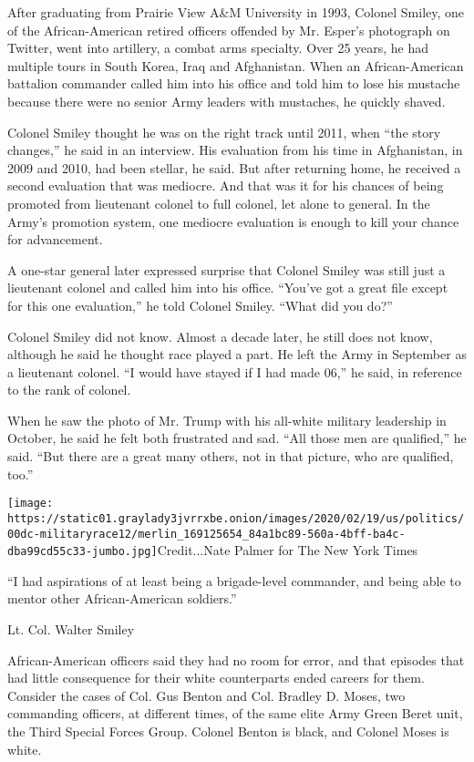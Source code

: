 After graduating from Prairie View A\&M University in 1993, Colonel
Smiley, one of the African-American retired officers offended by Mr.
Esper's photograph on Twitter, went into artillery, a combat arms
specialty. Over 25 years, he had multiple tours in South Korea, Iraq and
Afghanistan. When an African-American battalion commander called him
into his office and told him to lose his mustache because there were no
senior Army leaders with mustaches, he quickly shaved.

Colonel Smiley thought he was on the right track until 2011, when ``the
story changes,'' he said in an interview. His evaluation from his time
in Afghanistan, in 2009 and 2010, had been stellar, he said. But after
returning home, he received a second evaluation that was mediocre. And
that was it for his chances of being promoted from lieutenant colonel to
full colonel, let alone to general. In the Army's promotion system, one
mediocre evaluation is enough to kill your chance for advancement.

A one-star general later expressed surprise that Colonel Smiley was
still just a lieutenant colonel and called him into his office. ``You've
got a great file except for this one evaluation,'' he told Colonel
Smiley. ``What did you do?''

Colonel Smiley did not know. Almost a decade later, he still does not
know, although he said he thought race played a part. He left the Army
in September as a lieutenant colonel. ``I would have stayed if I had
made 06,'' he said, in reference to the rank of colonel.

When he saw the photo of Mr. Trump with his all-white military
leadership in October, he said he felt both frustrated and sad. ``All
those men are qualified,'' he said. ``But there are a great many others,
not in that picture, who are qualified, too.''

\texttt{[image: https://static01.graylady3jvrrxbe.onion/images/2020/02/19/us/politics/00dc-militaryrace12/merlin\_169125654\_84a1bc89-560a-4bff-ba4c-dba99cd55c33-jumbo.jpg]}Credit...Nate
Palmer for The New York Times

``I had aspirations of at least being a brigade-level commander, and
being able to mentor other African-American soldiers.''

Lt. Col. Walter Smiley

African-American officers said they had no room for error, and that
episodes that had little consequence for their white counterparts ended
careers for them. Consider the cases of Col. Gus Benton and Col. Bradley
D. Moses, two commanding officers, at different times, of the same elite
Army Green Beret unit, the Third Special Forces Group. Colonel Benton is
black, and Colonel Moses is white.

